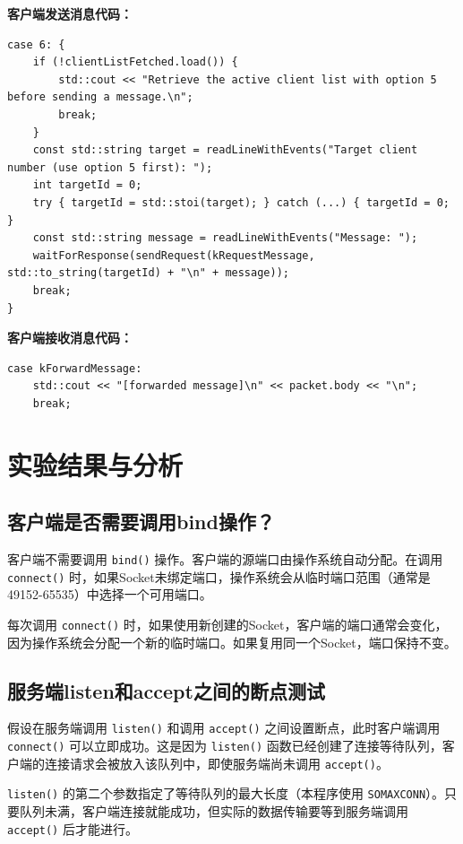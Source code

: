 \documentclass[12pt,a4paper]{article}
\begin{document}
\textbf{客户端发送消息代码：}

\begin{lstlisting}[style=cpp,caption={客户端发送消息}]
case 6: {
    if (!clientListFetched.load()) {
        std::cout << "Retrieve the active client list with option 5 before sending a message.\n";
        break;
    }
    const std::string target = readLineWithEvents("Target client number (use option 5 first): ");
    int targetId = 0;
    try { targetId = std::stoi(target); } catch (...) { targetId = 0; }
    const std::string message = readLineWithEvents("Message: ");
    waitForResponse(sendRequest(kRequestMessage, std::to_string(targetId) + "\n" + message));
    break;
}
\end{lstlisting}

\textbf{客户端接收消息代码：}

\begin{lstlisting}[style=cpp,caption={客户端处理转发消息}]
case kForwardMessage:
    std::cout << "[forwarded message]\n" << packet.body << "\n";
    break;
\end{lstlisting}

\section{实验结果与分析}

\subsection{客户端是否需要调用bind操作？}

客户端不需要调用 \texttt{bind()} 操作。客户端的源端口由操作系统自动分配。在调用 \texttt{connect()} 时，如果Socket未绑定端口，操作系统会从临时端口范围（通常是49152-65535）中选择一个可用端口。

每次调用 \texttt{connect()} 时，如果使用新创建的Socket，客户端的端口通常会变化，因为操作系统会分配一个新的临时端口。如果复用同一个Socket，端口保持不变。

\subsection{服务端listen和accept之间的断点测试}

假设在服务端调用 \texttt{listen()} 和调用 \texttt{accept()} 之间设置断点，此时客户端调用 \texttt{connect()} 可以立即成功。这是因为 \texttt{listen()} 函数已经创建了连接等待队列，客户端的连接请求会被放入该队列中，即使服务端尚未调用 \texttt{accept()}。

\texttt{listen()} 的第二个参数指定了等待队列的最大长度（本程序使用 \texttt{SOMAXCONN}）。只要队列未满，客户端连接就能成功，但实际的数据传输要等到服务端调用 \texttt{accept()} 后才能进行。
\end{document}
